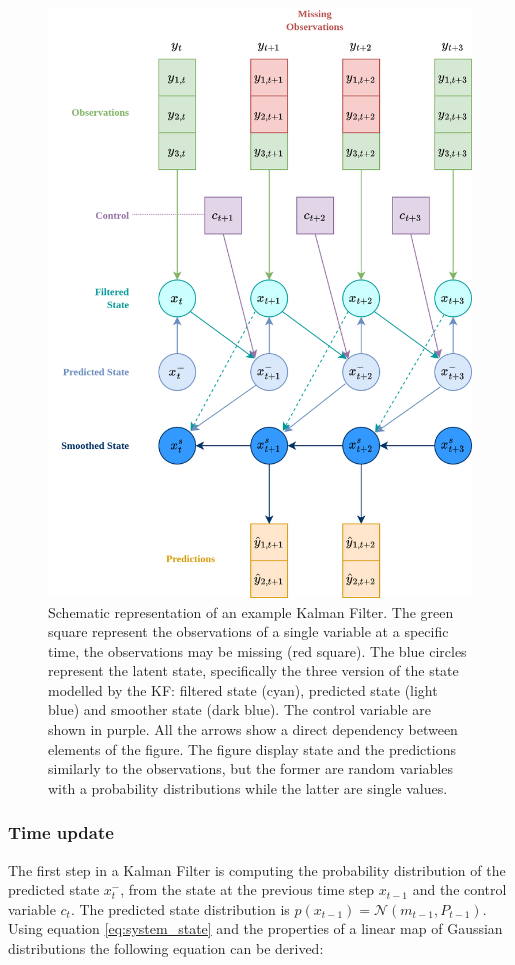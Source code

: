 \documentclass{article}
\begin{document}
\begin{figure}
\centerline{\includegraphics[width=4.5in]{Kalman Filter figure.png}}
\caption{Schematic representation of an example Kalman Filter. The green square represent the observations of a single variable at a specific time, the observations may be missing (red square). The blue circles represent the latent state, specifically the three version of the state modelled by the KF: filtered state (cyan), predicted state (light blue) and smoother state (dark blue). The control variable are shown in purple.
All the arrows show a direct dependency between elements of the figure. The figure display state and the predictions similarly to the observations, but the former are random variables with a probability distributions while the latter are single values.}
\label{fig:kalman_filter}
\end{figure}

\subsubsection{Time update}

The first step in a Kalman Filter is computing the probability distribution of the predicted state $x^-_t$, from the state at the previous time step $x_{t-1}$ and the control variable $c_t$. The predicted state distribution is $p(x_{t-1}) = \mathcal{N}(m_{t-1}, P_{t-1})$.  Using equation \ref{eq:system_state} and the properties of a linear map of Gaussian distributions the following equation can be derived:
\end{document}
